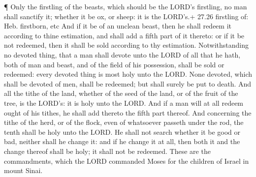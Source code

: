  ¶ Only the firstling of the beasts, which should be the
LORD's firstling, no man shall sanctify it; whether it be ox, or sheep:
it is the LORD's.+ 27.26 firstling of: Heb. firstborn, etc 
And if it be of an unclean beast, then he shall redeem it according to
thine estimation, and shall add a fifth part of it thereto: or if it be
not redeemed, then it shall be sold according to thy estimation.
 Notwithstanding no devoted thing, that a man shall devote
unto the LORD of all that he hath, both of man and beast, and of the
field of his possession, shall be sold or redeemed: every devoted thing
is most holy unto the LORD.  None devoted, which shall be
devoted of men, shall be redeemed; but shall surely be put to death.
 And all the tithe of the land, whether of the seed of the
land, or of the fruit of the tree, is the LORD's: it is holy unto the
LORD.  And if a man will at all redeem ought of his tithes,
he shall add thereto the fifth part thereof.  And
concerning the tithe of the herd, or of the flock, even of whatsoever
passeth under the rod, the tenth shall be holy unto the LORD.
 He shall not search whether it be good or bad, neither
shall he change it: and if he change it at all, then both it and the
change thereof shall be holy; it shall not be redeemed. 
These are the commandments, which the LORD commanded Moses for the
children of Israel in mount Sinai.
